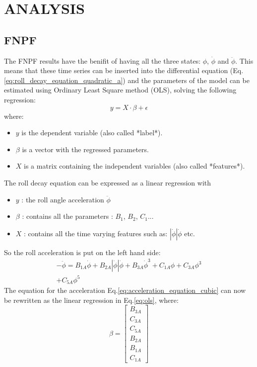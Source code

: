 \section*{ANALYSIS}\label{analysis}
\subsection*{FNPF}\label{fnpf}
The FNPF results have the benifit of having all the three states:
$\phi$, $\dot{\phi}$ and $\ddot{\phi}$. This means that these time
series can be inserted into the differential equation
(Eq.\ref{eq:roll_decay_equation_quadratic_a}) and the parameters
of the model can be estimated using Ordinary Least Square method (OLS),
solving the following regression:
\begin{equation}
y = X \cdot \beta + \epsilon
\label{ols}
\end{equation}
where:
\begin{itemize}
\item $y$ is the dependent variable (also called *label*).
\item $\beta$ is a vector with the regressed parameters.
\item $X$ is a matrix containing the independent variables (also called *features*).
\end{itemize}
The roll decay equation can be expressed as a linear regression with
\begin{itemize}
\item $y$ : the roll angle acceleration $\ddot{\phi}$
\item $\beta$ : contains all the parameters : $B_1$, $B_2$, $C_1$...
\item $X$ : contains all the time varying features such as: $| \dot{\phi} | \dot{\phi} $ etc.
\end{itemize}
So the roll acceleration is put on the left hand side:
\begin{equation}
\begin{aligned}
- \ddot{\phi} = B_{1A} \dot{\phi} + B_{2A} \left|{\dot{\phi}}\right| \dot{\phi} + B_{3A} \dot{\phi}^{3} + C_{1A} \phi + C_{3A} \phi^{3} \\ + C_{5A} \phi^{5}
\end{aligned}
\label{acceleration_equation_cubic}
\end{equation}
The equation for the acceleration
Eq.\ref{eq:acceleration_equation_cubic} can now be rewritten as
the linear regression in Eq.\ref{eq:ols}, where:
\begin{equation}
\beta = \left[\begin{matrix}B_{3A}\\C_{3A}\\C_{5A}\\B_{2A}\\B_{1A}\\C_{1A}\end{matrix}\right]
\label{eq_beta}
\end{equation}
